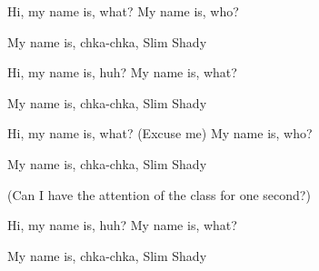 Hi, my name is, what? My name is, who?

My name is, chka-chka, Slim Shady

Hi, my name is, huh? My name is, what?

My name is, chka-chka, Slim Shady

Hi, my name is, what? (Excuse me) My name is, who?

My name is, chka-chka, Slim Shady

(Can I have the attention of the class for one second?)

Hi, my name is, huh? My name is, what?

My name is, chka-chka, Slim Shady



\clearpage